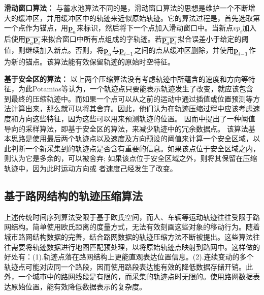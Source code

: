 \textbf{滑动窗口算法：}
与蓄水池算法不同的是，滑动窗口算法\cite{ICDMSiding,EDBTSliding}的思想是维护一个不断增大的缓冲区，并用缓冲区中的轨迹来近似原始轨迹。它的算法过程是，首先选取第一个点作为锚点，用$\emph{{\textbf{p}}}_a$来标识，然后将下一个点加入滑动窗口中。当新点$vp_{i}$加入后使用$\overline{\emph{{\textbf{p}}}_a \emph{{\textbf{p}}}_i}$来拟合窗口中所有点组成的字轨迹。若$\overline{\emph{{\textbf{p}}}_a \emph{{\textbf{p}}}_i}$拟合误差小于给定的阈值，则继续加入新点。否则，将$\emph{{\textbf{p}}}_a$与$\emph{{\textbf{p}}}_{i-1}$之间的点从缓冲区删除，并使用$\emph{{\textbf{p}}}_{i-1}$作为新的锚点。该算法能有效保留轨迹的原始时空特征。


\textbf{基于安全区的算法：}
以上两个压缩算法没有考虑轨迹中所蕴含的速度和方向等特征，为此Potamias\cite{SSDBMSample}等认为，一个轨迹点只要能表示轨迹发生了改变，就应该包含到最终的压缩轨迹中。而如果一个点可以从之前的运动中通过插值或位置预测等方法计算出来，那么就可以将其舍弃。因此，他们认为在轨迹压缩过程中应该考虑速度和方向这些特征，因为这些可以用来预测轨迹的位置。
因而中提出了一种阈值导向的采样算法，即基于安全区的算法，来减少轨迹中的冗余数据点。
该算法基本思路是使用最后两个轨迹点以及速度及方向预设的阈值来计算一个安全区域，以此判断一个新采集到的轨迹点是否含有重要的信息。如果该点位于安全区域之内，则认为它是多余的，可以被舍弃; 如果该点位于安全区域之外，则将其保留在压缩轨迹中，因为此时运动方向或 者速度己经发生了改变。

\subsection{基于路网结构的轨迹压缩算法}
上述传统时间序列算法受限于基于欧氏空间，而人、车辆等运动轨迹往往受限于路网结构。简单使用欧氏距离的度量方式，无法有效刻画这些对象的移动行为。随着城市路网结构数据的完善，结合路网数据的轨迹压缩方法不断被提出\cite{YinW04,nonmaterialized,DMDL2,MDL1}。这些算法往往需要将轨迹数据进行地图匹配预处理，以将原始轨迹点映射到路网中。这样做的好处有：(1).轨迹点落在路网结构上更能直观表达位置信息。(2).连续变动的多个轨迹点可能对应同一个路段，因而使用路段表达能有效的降低数据存储开销。此外，一个城市中的路网线段是有限的，而采集的轨迹点时无限的。使用路网数据表达原始位置，能有效降低数据表示的复杂度。

